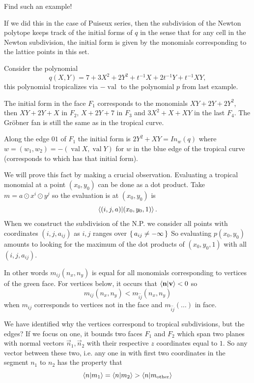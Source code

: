 \documentclass[12pt]{memoir}
\DeclareMathOperator{\val}{val}
\begin{document}
\begin{Ej}[5]
Find such an example!
\end{Ej}

If we did this in the case of Puiseux series, then the subdivision of the Newton polytope keeps track of the initial forms of $q$ in the sense that for any cell in the Newton subdivision, the initial form is given by the monomials corresponding to the lattice points in this set.

\begin{Ex}
    Consider the polynomial 
    $$q(X,Y)=7+3X^2+2Y^2+t^{-1}X+2t^{-1}Y+t^{-1}XY,$$
    this polynomial tropicalizes via $-\val$ to the polynomial $p$ from last example.\par {}\par 
    The initial form in the face $F_1$ corresponds to the monomials $XY+2Y+2Y^2$, then $XY+2Y+X$ in $F_2$, $X+2Y+7$ in $F_3$ and $3X^2+X+XY$ in the last $F_4$. The Gr\"obner fan is still the same as in the tropical curve.\par 
    Along the edge $01$ of $F_1$ the initial form is $2Y^2+XY=In_w(q)$ where $w=(w_1,w_2)=-(\val X,\val Y)$ for $w$ in the blue edge of the tropical curve (corresponds to  which has that initial form). 
\end{Ex}

We will prove this fact by making a crucial observation. Evaluating a tropical monomial at a point $(x_0,y_0)$ can be done as a dot product. Take $m=a\odot x^i\odot y^j$ so the evaluation is at $(x_0,y_0)$ is 
$$\braket{(i,j,a)}{(x_0,y_0,1)}.$$
When we construct the subdivision of the N.P. we consider all points with coordinates $(i,j,a_{ij})$ as $i,j$ ranges over $\{\,a_{ij}\neq -\infty\,\}$
So evaluating $p(x_0,y_0)$ amounts to looking for the maximum of the dot products of $(x_0,y_0,1)$ with all $(i,j,a_{ij})$.\par 
{}\par 
In other words $m_{ij}(n_x,n_y)$ is equal for all monomials corresponding to vertices of the green face. For vertices below, it occurs that $\braket{\mathbf{n}}{\mathbf{v}}<0$ so 
$$m_{ij}(n_x,n_y)<m_{\tilde i\tilde j}(n_x,n_y)$$
when $m_{ij}$ corresponds to vertices not in the face and $m_{\tilde i\tilde j}(\dots)$ in face.\par 
We have identified why the vertices correspond to tropical subdivisions, but the edges? If we focus on one, it bounds two faces $F_1$ and $F_2$ which span two planes with normal vectors $\vec n_1,\vec n_2$ with their respective $z$ coordinates equal to $1$. So any vector between these two, i.e. any one in with first two coordinates in the segment $n_1$ to $n_2$ has the property that 
$$\braket{n}{m_1}=\braket{n}{m_2}>\braket{n}{m_{\text{other}}}$$ %

\ifx\nextra\undefined
\printindex
\else\fi
\nocite{*}


\end{document}
